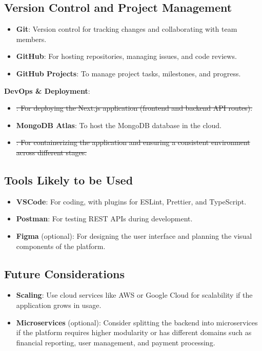 \documentclass{article}
\begin{document}
\subsection{Version Control and Project Management}
\begin{itemize}
  \item \textbf{Git}: Version control for tracking changes and collaborating with team members.
  \item \textbf{GitHub}: For hosting repositories, managing issues, and code reviews.
  \item \textbf{GitHub Projects}: To manage project tasks, milestones, and progress.
\end{itemize}

\textbf{DevOps \& Deployment}:
\begin{itemize}
  \item \sout{: For deploying the Next.js application (frontend and backend API routes).}\emph{\color{red}{(Caption: Deployment strategy revised)}}
  \item \textbf{MongoDB Atlas}: To host the MongoDB database in the cloud.
  \item \sout{: For containerizing the application and ensuring a consistent environment across different stages.}\emph{\color{red}{(Caption: Containerization deemed unnecessary)}}
\end{itemize}

\subsection{Tools Likely to be Used}
\begin{itemize}
  \item \textbf{VSCode}: For coding, with plugins for ESLint, Prettier, and TypeScript.
  \item \textbf{Postman}: For testing REST APIs during development.
  \item \textbf{Figma} (optional): For designing the user interface and planning the visual components of the platform.
\end{itemize}

\subsection{Future Considerations}
\begin{itemize}
  \item \textbf{Scaling}: Use cloud services like AWS or Google Cloud for scalability if the application grows in usage.
  \item \textbf{Microservices} (optional): Consider splitting the backend into microservices if the platform requires higher modularity or has different domains such as financial reporting, user management, and payment processing.
\end{itemize}
\end{document}
